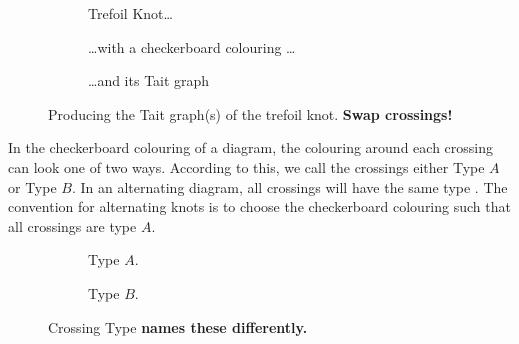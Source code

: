 \documentclass[12pt]{report}
\newcommand{\notered}[1]{{\color{Red} \textbf{#1}}}
\begin{document}
\begin{figure}[hbt]
	\centering
	\hspace*{\fill}
	\begin{subfigure}[b]{0.3 \textwidth}
		\centering
		\def\svgscale{0.2}
		
		\caption{Trefoil Knot\dots}
		\label{fig:trefoil-blank}
	\end{subfigure}
	\hspace*{\fill}
	\begin{subfigure}[b]{0.3 \textwidth}
		\centering
		\def\svgscale{0.2}
		
		\caption{\dots with a checkerboard colouring \dots}
		\label{fig:trefoil-checker}
	\end{subfigure}
	\hspace*{\fill}
	\begin{subfigure}[b]{0.3 \textwidth}
		\centering
		\def\svgscale{0.2}
		
		\caption{\dots and its Tait graph}
		\label{fig:trefoil-checker-tait}
	\end{subfigure}
	\hspace*{\fill}
	\caption{Producing the Tait graph(s) of the trefoil knot. \notered{Swap crossings!}}
	\label{fig:tait-example}
\end{figure}


In the checkerboard colouring of a diagram, the colouring around each crossing can look one of two ways. According to this, we call the crossings either Type $A$ or Type $B$. In an alternating diagram, all crossings will have the same type \cite[300]{spanning-tree-expansion-jones-polynomial}. The convention for alternating knots is to choose the checkerboard colouring such that all crossings are type $A$.

\begin{figure}[hbt]
	\centering
	\hspace*{\fill}
	\begin{subfigure}[b]{0.4 \textwidth}
		\centering
		\def\svgscale{0.28}
		
		\caption{Type $A$.}
		\label{fig:type-a}
	\end{subfigure}
	\hspace*{\fill} \hspace*{\fill}	\hspace*{\fill}
	\begin{subfigure}[b]{0.4 \textwidth}
		\centering
		\def\svgscale{0.28}
		
		\caption{Type $B$.}
		\label{fig:type-b}
	\end{subfigure}
	\hspace*{\fill} 
	\caption{Crossing Type \notered{\cite{alternating-links-thickened-surfaces} names these differently.}}
	\label{fig:crossing-type}
\end{figure}
\end{document}
